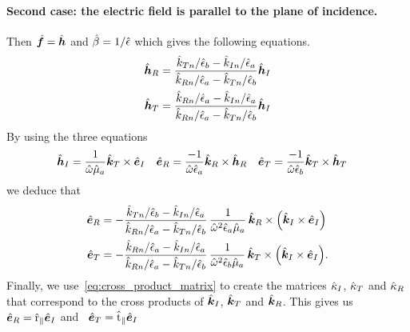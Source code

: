 \paragraph{Second case: the electric field is parallel to the plane of incidence.}
Then $\hat{\bm{f}}=\hat{\bm{h}}$ and $\hat{\beta}=1/\hat{\epsilon}$ which gives the following equations.
\begin{align}
    \hat{\bm{h}}_R
    &=
    \frac{
        \hat{k}_{T n} / \hat{\epsilon}_b - \hat{k}_{I n} / \hat{\epsilon}_a
    }{
        \hat{k}_{R n} / \hat{\epsilon}_a - \hat{k}_{T n} / \hat{\epsilon}_b
    }
    \hat{\bm{h}}_I
    \\
    \hat{\bm{h}}_T
    &=
    \frac{
        \hat{k}_{R n} / \hat{\epsilon}_a - \hat{k}_{I n} / \hat{\epsilon}_a
    }{
        \hat{k}_{R n} / \hat{\epsilon}_a - \hat{k}_{T n} / \hat{\epsilon}_b
    }
    \hat{\bm{h}}_I
\end{align}
By using the three equations
\begin{align}
    \hat{\bm{h}}_I &= \frac{1}{\hat{\omega}\hat{\mu}_a} \hat{\bm{k}}_T \times \hat{\bm{e}}_I
    &
    \hat{\bm{e}}_R &= \frac{-1}{\hat{\omega}\hat{\epsilon}_a} \hat{\bm{k}}_R \times \hat{\bm{h}}_R
    &
    \hat{\bm{e}}_T &= \frac{-1}{\hat{\omega}\hat{\epsilon}_b} \hat{\bm{k}}_T \times \hat{\bm{h}}_T
\end{align}
we deduce that
\begin{align}
    \vectcp{e}_\R
    &=
    -
    \frac{
        \cp{k}_{\T n} / \cp{\epsilon}_b  -  \cp{k}_{\I n} / \cp{\epsilon}_a
    }{
        \cp{k}_{\R n} / \cp{\epsilon}_a  -  \cp{k}_{\T n} / \cp{\epsilon}_b
    }
    \,
    \frac{1}{
        \cp{\omega}^2 \cp{\epsilon}_a \cp{\mu}_a
    }
    \,
    \vectcp{k}_\R \times \left( \vectcp{k}_\I \times \vectcp{e}_\I \right)
    \\
    \vectcp{e}_\T
    &=
    -
    \frac{
        \cp{k}_{\R n} / \cp{\epsilon}_a - \cp{k}_{\I n} / \cp{\epsilon}_a
    }{
        \cp{k}_{\R n} / \cp{\epsilon}_a - \cp{k}_{\T n} / \cp{\epsilon}_b
    }
    \,
    \frac{1}{
        \cp{\omega}^2 \cp{\epsilon}_b \cp{\mu}_a
    }
    \,
    \vectcp{k}_\T \times \left( \vectcp{k}_\I \times \vectcp{e}_\I \right)
    \text{.}
\end{align}
Finally, we use~\vref{eq:cross_product_matrix} to create the matrices
$\hat{\mathrm{\kappa}}_I$, $\hat{\mathrm{\kappa}}_T$ and $\hat{\mathrm{\kappa}}_R$
that correspond to the cross products of
$\hat{\bm{k}}_I$, $\hat{\bm{k}}_T$ and $\hat{\bm{k}}_R$.
This gives us%
~$\hat{\bm{e}}_R = \hat{\mathrm{r}}_\parallel \hat{\bm{e}}_I$
and%
~$\hat{\bm{e}}_T = \hat{\mathrm{t}}_\parallel \hat{\bm{e}}_I$
